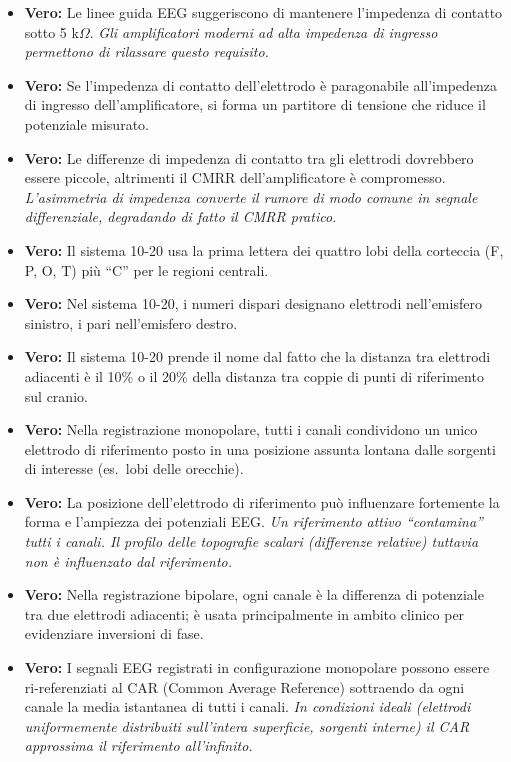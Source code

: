 \begin{itemize}
    \item \textbf{Vero:} Le linee guida EEG suggeriscono di mantenere l'impedenza di contatto sotto 5 k$\Omega$.
    \textit{Gli amplificatori moderni ad alta impedenza di ingresso permettono di rilassare questo requisito.}
    
    \item \textbf{Vero:} Se l'impedenza di contatto dell'elettrodo è paragonabile all'impedenza di ingresso dell'amplificatore, si forma un partitore di tensione che riduce il potenziale misurato.
    
    \item \textbf{Vero:} Le differenze di impedenza di contatto tra gli elettrodi dovrebbero essere piccole, altrimenti il CMRR dell'amplificatore è compromesso.
    \textit{L'asimmetria di impedenza converte il rumore di modo comune in segnale differenziale, degradando di fatto il CMRR pratico.}
    
    \item \textbf{Vero:} Il sistema 10-20 usa la prima lettera dei quattro lobi della corteccia (F, P, O, T) più ``C'' per le regioni centrali.
    
    \item \textbf{Vero:} Nel sistema 10-20, i numeri dispari designano elettrodi nell'emisfero sinistro, i pari nell'emisfero destro.
    
    \item \textbf{Vero:} Il sistema 10-20 prende il nome dal fatto che la distanza tra elettrodi adiacenti è il 10\% o il 20\% della distanza tra coppie di punti di riferimento sul cranio.
    
    \item \textbf{Vero:} Nella registrazione monopolare, tutti i canali condividono un unico elettrodo di riferimento posto in una posizione assunta lontana dalle sorgenti di interesse (es.\ lobi delle orecchie).
    
    \item \textbf{Vero:} La posizione dell'elettrodo di riferimento può influenzare fortemente la forma e l'ampiezza dei potenziali EEG.
    \textit{Un riferimento attivo ``contamina'' tutti i canali. Il profilo delle topografie scalari (differenze relative) tuttavia non è influenzato dal riferimento.}
    
    \item \textbf{Vero:} Nella registrazione bipolare, ogni canale è la differenza di potenziale tra due elettrodi adiacenti; è usata principalmente in ambito clinico per evidenziare inversioni di fase.
    
    \item \textbf{Vero:} I segnali EEG registrati in configurazione monopolare possono essere ri-referenziati al CAR (Common Average Reference) sottraendo da ogni canale la media istantanea di tutti i canali.
    \textit{In condizioni ideali (elettrodi uniformemente distribuiti sull'intera superficie, sorgenti interne) il CAR approssima il riferimento all'infinito.}
\end{itemize}

